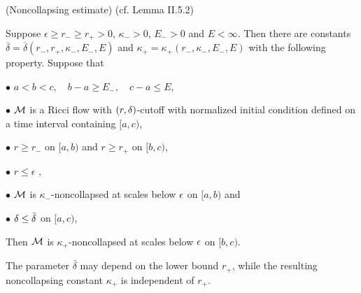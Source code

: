 \begin{lemma}
  \label{lem:kl-establishing-noncollapsing-presence-surgery-existence-kappa-solutions}
(Noncollapsing estimate) (cf. Lemma II.5.2)
\label{II.5.2}

Suppose $\epsilon \ge r_- \ge r_+ >0$, $\kappa_->0$, $E_->0$ and $E<\infty$.
Then there are constants $\overline{\delta} =
\overline{\delta}(r_-,r_+,\kappa_-,E_-,E)$
and $\kappa_+=\kappa_+(r_-,\kappa_-,E_-,E)$ with
the following property.  Suppose that

$\bullet$  $a<b<c,\quad b-a\geq E_-,\quad c-a\leq E$,

$\bullet$  ${\mathcal M}$ is a Ricci flow with $(r,\delta)$-cutoff
with normalized initial condition
defined on a time interval containing $[a,c)$,

$\bullet$ $r\geq r_-$ on $[a,b)$ and $r\geq r_+$ on $[b,c)$,

$\bullet$ $r \le \epsilon$ ,

$\bullet$ ${\mathcal M}$ is $\kappa_-$-noncollapsed at scales below
$\epsilon$ on $[a,b)$ and

$\bullet$ $\delta\leq \bar{\delta}$ on $[a,c)$,


Then ${\mathcal M}$ is $\kappa_+$-noncollapsed at scales below $\epsilon$
on $[b,c)$.
\end{lemma}

\begin{remark}
\label{rem:kl-establishing-noncollapsing-presence-surgery-estimates-kappa-solutions}


The parameter $\bar\delta$ may depend on the lower bound $r_+$, while the resulting noncollapsing constant $\kappa_+$ is independent of $r_+$.
\end{remark}

